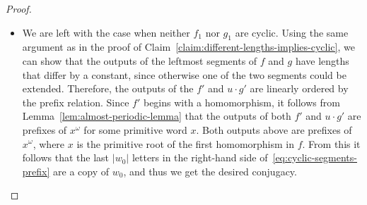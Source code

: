 \begin{proof}
\begin{itemize}
        Choose some input $a_0 \in A_i^*$ so that $f_1(a)$ has length at least $|u|$, and therefore $f_1(a)$ begins with $u$. Such an input exists, since we assume that all homomorphisms involved are nonempty. For every input $a \in A_i^*$ we have 
    \begin{align*}
    f_1(a) \cdot f_1(a_0)  \quad \text{is a prefix of} \quad
    u \cdot g_1(a) \cdot g_1(a_0).
    \end{align*}
    Since the strings $f_1(a)$ and $g_1(a)$ have the same length, it follows that  the last $|u|$ letters in $u \cdot g_1(a)$ must be equal to the first $|u|$ letters in $f_1(a_0)$, and therefore they must be equal to $u$. This gives the desired conjugacy.
    \item We are left with the case when neither $f_1$ nor $g_1$ are cyclic.     Using the same argument as in the proof of Claim~\ref{claim:different-lengths-implies-cyclic}, we can show that the outputs of the leftmost segments of $f$ and $g$ have lengths that differ by a constant, since otherwise one of the two segments could be extended. Therefore, the outputs of the $f'$ and $u \cdot g'$ are linearly ordered by the prefix relation. Since $f'$ begins with a homomorphism, it follows from Lemma~\ref{lem:almost-periodic-lemma} that the outputs of both $f'$ and $u \cdot g'$ are prefixes of $x^\omega$ for some primitive word $x$. 
    Both outputs above are prefixes of $x^\omega$, where $x$ is the primitive root of the first homomorphism in $f$. From this it follows that the last $|w_0|$ letters in the right-hand side of~\eqref{eq:cyclic-segments-prefix} are a copy of $w_0$, and thus we get the desired conjugacy. 
    \end{itemize}
\end{proof}

